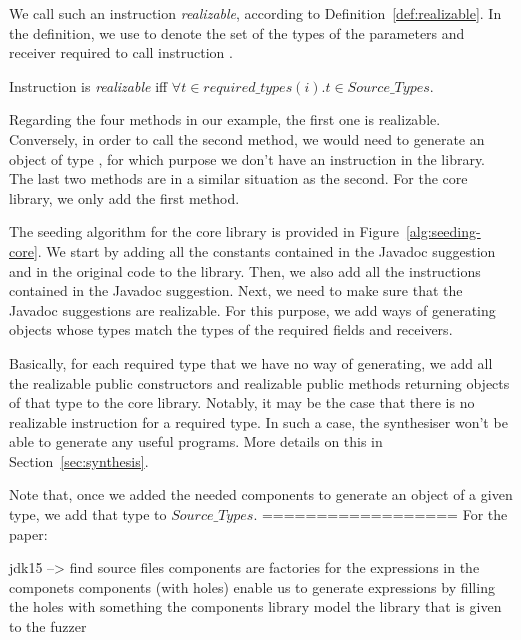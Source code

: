 \documentclass[runningheads,a4paper]{llncs}
\begin{document}
We call such an instruction {\em realizable}, according to Definition~\ref{def:realizable}.
In the definition, we use
 to denote
the set of the types of the parameters and receiver required to call instruction .

\begin{definition}\label{def:realizable}
Instruction  is {\em realizable} iff $\forall t \in required\_types(i). t \in Source\_Types$.
  
\end{definition}

Regarding the four methods in our example, the first one is realizable. Conversely, in order to call the second method, we would need to generate an object of type ,
for which purpose we don't have an instruction in the library.
The last two methods are in a similar situation as the second. For the core library, we only add the first method.


The seeding algorithm for the core library is provided in Figure~\ref{alg:seeding-core}.
We start by adding all the constants contained in the Javadoc suggestion
and in the original code to the library. Then, we also add all the instructions contained
in the Javadoc suggestion. Next, we need to make sure that the Javadoc suggestions
are realizable. For this purpose, we add ways of generating
objects whose types match the types of the required fields and receivers.

Basically, for each required type that we have no way of generating, we add all the realizable
public constructors and realizable public methods returning objects of that type to the
core library.
Notably, it may be the case that there is no realizable instruction for a required type.
In such a case, the synthesiser won't be able to generate any useful programs.
More details on this in Section~\ref{sec:synthesis}.

Note that, once we added the needed components to generate an object of a given type,
we add that type to $Source\_Types$.
==================
For the paper:

jdk15 --> find source files
components are factories for the expressions in the componets
components (with holes) enable us to generate expressions by filling the holes with something
the components library model the library that is given to the fuzzer
\end{document}

